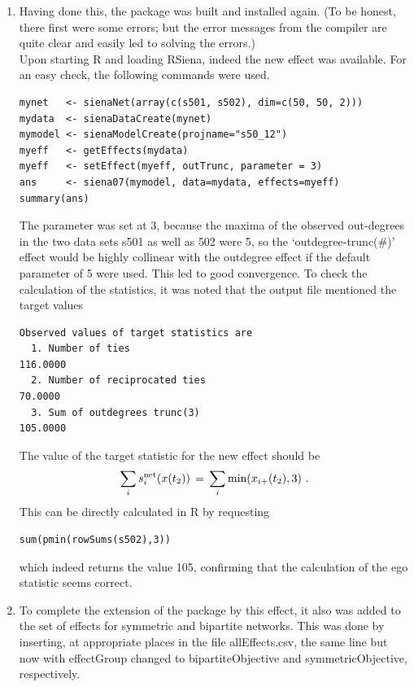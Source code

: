 \documentclass[a4paper,fleqn,11pt]{article}
\newcommand{\+}{\, + \,}
\newcommand{\sfn}[1]{\textsf{#1}}
\newcommand{\R}{{\sf R }}
\newcommand{\rs}{{\sf RSiena}}
\begin{document}
{\begin{enumerate}
\item Having done this, the package was built and installed again.
      (To be honest, there first were some errors; but the error messages
       from the compiler are quite clear and easily led to solving
       the errors.)\\
      Upon starting \R and loading \rs, indeed the new effect  was
      available. For an easy check, the following commands
      were used.
{\small
\begin{verbatim}
mynet   <- sienaNet(array(c(s501, s502), dim=c(50, 50, 2)))
mydata  <- sienaDataCreate(mynet)
mymodel <- sienaModelCreate(projname="s50_12")
myeff   <- getEffects(mydata)
myeff   <- setEffect(myeff, outTrunc, parameter = 3)
ans     <- siena07(mymodel, data=mydata, effects=myeff)
summary(ans)
\end{verbatim}
}
      The parameter was set at 3, because the maxima of the
      observed out-degrees
      in the two data sets \sfn{s501} as well as \sfn{502} were 5,
      so the `outdegree-trunc(\#)' effect would be highly collinear with the
      outdegree effect if the default parameter of 5 were used.
      This led to good convergence. To check the calculation of the
      statistics, it was noted that the output file
      mentioned the target values
{\small
\begin{verbatim}
Observed values of target statistics are
  1. Number of ties                                           116.0000
  2. Number of reciprocated ties                               70.0000
  3. Sum of outdegrees trunc(3)                               105.0000
\end{verbatim}
}
      The value of the target statistic for the new effect should be
      \[
       \sum_i s^{\rm net}_{i}(x(t_2)) \,=\,
                         \sum_i \text{min}(x_{i+}(t_2), 3) \ .
      \]
      This can be directly calculated in \R by requesting
\begin{verbatim}
sum(pmin(rowSums(s502),3))
\end{verbatim}
      which indeed returns the value 105, confirming that the calculation
      of the ego statistic seems correct.
\item To complete the extension of the package by this effect,
      it also was added to the set of effects for symmetric
      and bipartite networks.
      This was done by inserting, at appropriate places in the file
      \sfn{allEffects.csv},
      the same line but now with \sfn{effectGroup}
      changed to \sfn{bipartiteObjective} and \sfn{symmetricObjective},
      respectively.
\end{enumerate}

}
\end{document}

